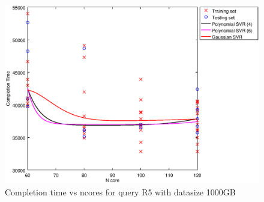
\begin {figure}[hbtp]
\centering
\includegraphics[width=\textwidth]{output/R5_1000_ONLY_1_OVER_NCORES/plot_R5_1000_bestmodels.eps}
\caption{Completion time vs ncores for query R5 with datasize 1000GB}
\label{fig:all_nonlinear_R5_1000}
\end {figure}
